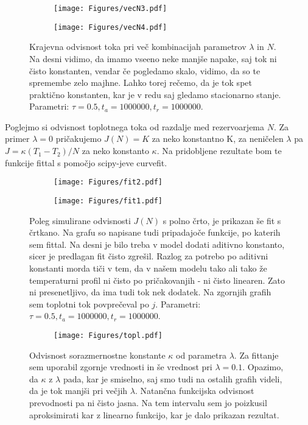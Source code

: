 \documentclass{article}
\begin{document}
\begin{figure}[H]
\centering
\begin{subfigure}{.49\textwidth}
\texttt{[image: Figures/vecN3.pdf]}
\end{subfigure}
\begin{subfigure}{.49\textwidth}
\texttt{[image: Figures/vecN4.pdf]}
\end{subfigure}
\caption*{Krajevna odvisnost toka pri več kombinacijah parametrov $\lambda$ in $N$. Na desni vidimo, da imamo vseeno neke manjše napake, saj tok ni čisto konstanten, vendar če pogledamo skalo, vidimo, da so te spremembe zelo majhne. Lahko torej rečemo, da je tok spet praktično konstanten, kar je v redu saj gledamo stacionarno stanje. Parametri: $\tau=0.5, t_a=1000000, t_r=1000000$.}
\end{figure}

Poglejmo si odvisnost toplotnega toka od razdalje med rezervoarjema $N$. Za primer $\lambda=0$ pričakujemo $J(N) = K$ za neko konstantno K, za neničelen $\lambda$ pa $J = \kappa (T_1-T_2)/N$ za neko konstanto $\kappa$. Na pridobljene rezultate bom te funkcije fittal s pomočjo scipy-jeve curvefit.

\begin{figure}[H]
\centering
\begin{subfigure}{.49\textwidth}
\texttt{[image: Figures/fit2.pdf]}
\end{subfigure}
\begin{subfigure}{.49\textwidth}
\texttt{[image: Figures/fit1.pdf]}
\end{subfigure}
\caption*{Poleg simulirane odvisnosti $J(N)$ s polno črto, je prikazan še fit s črtkano. Na grafu so napisane tudi pripadajoče funkcije, po katerih sem fittal. Na desni je bilo treba v model dodati aditivno konstanto, sicer je predlagan fit čisto zgrešil. Razlog za potrebo po aditivni konstanti morda tiči v tem, da v našem modelu tako ali tako že temperaturni profil ni čisto po pričakovanjih - ni čisto linearen. Zato ni presenetljivo, da ima tudi tok nek dodatek.  Na zgornjih grafih sem toplotni tok povprečeval po $j$. Parametri: $\tau=0.5, t_a=1000000, t_r=1000000$.}
\end{figure}

\begin{figure}[H]
\centering
\begin{subfigure}{.6\textwidth}
\texttt{[image: Figures/topl.pdf]}
\end{subfigure}
\caption*{Odvisnost sorazmernostne konstante $\kappa$ od parametra $\lambda$. Za fittanje sem uporabil zgornje vrednosti in še vrednost pri $\lambda=0.1$. Opazimo, da $\kappa$ z $\lambda$ pada, kar je smiselno, saj smo tudi na ostalih grafih videli, da je tok manjši pri večjih $\lambda$. Natančna funkcijska odvisnost prevodnosti pa ni čisto jasna. Na tem intervalu sem jo poizkusil aproksimirati kar z linearno funkcijo, kar je dalo prikazan rezultat.}
\end{figure}
\end{document}
